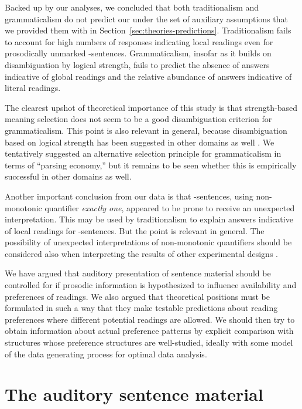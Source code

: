 \documentclass[fleqn,reqno,10pt]{article}
\renewcommand{\es}{\acro{es}}
\begin{document}
Backed up by our analyses, we concluded that both traditionalism and
grammaticalism do not predict our under the set of auxiliary
assumptions that we provided them with in
Section~\ref{sec:theories-predictions}. Traditionalism fails to
account for high numbers of responses indicating local readings even
for prosodically unmarked \es-sentences. Grammaticalism, insofar as it
builds on disambiguation by logical strength, fails to predict the
absence of answers indicative of global readings and the relative
abundance of answers indicative of literal readings.

The clearest upshot of theoretical importance of this study is that
strength-based meaning selection does not seem to be a good
disambiguation criterion for grammaticalism. This point is also
relevant in general, because disambiguation based on logical strength
has been suggested in other domains as well
\citep[e.g.][]{DalrympleKanazawa1998:Reciprocal-Expr,CobrerosEgre2012:Tolerant-Classi}.
We tentatively suggested an alternative selection principle for
grammaticalism in terms of ``parsing economy,'' but it remains to be
seen whether this is empirically successful in other domains as well.

Another important conclusion from our data is that \es-sentences,
using non-monotonic quantifier \emph{exactly one}, appeared to be
prone to receive an unexpected interpretation. This may be used by
traditionalism to explain answers indicative of local readings for
\es-sentences. But the point is relevant in general. The possibility
of unexpected interpretations of non-monotonic quantifiers should be
considered also when interpreting the results of other experimental
designs \citep[e.g.][]{CliftonDube2010:Embedded-Implic,
  ChemlaSpector2010:Experimental-Ev}.

We have argued that auditory presentation of sentence material should
be controlled for if prosodic information is hypothesized to influence
availability and preferences of readings. We also argued that
theoretical positions must be formulated in such a way that they make
testable predictions about reading preferences where different
potential readings are allowed. We should then try to obtain
information about actual preference patterns by explicit comparison
with structures whose preference structures are well-studied, ideally
with some model of the data generating process for optimal data
analysis.

\newpage

\appendix

\section{The auditory sentence material}
\label{sec:audit-sent-mater}
\end{document}
